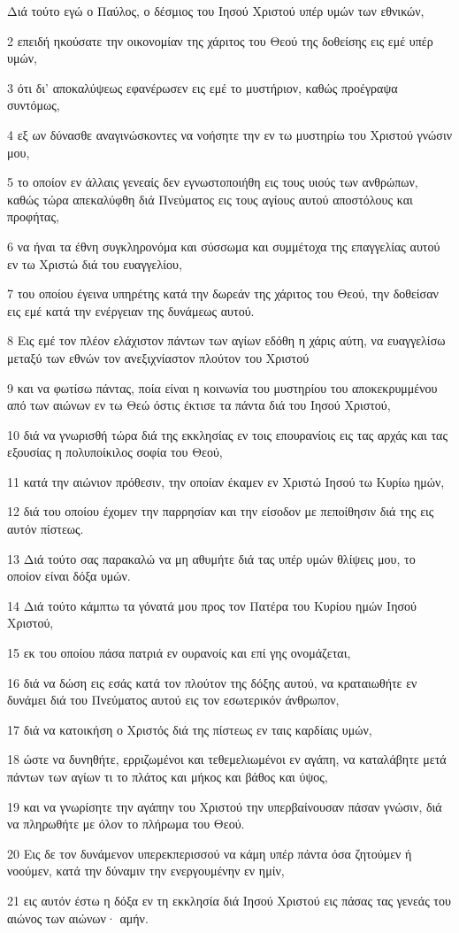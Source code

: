 \par Διά τούτο εγώ ο Παύλος, ο δέσμιος του Ιησού Χριστού υπέρ υμών των εθνικών,
\par 2 επειδή ηκούσατε την οικονομίαν της χάριτος του Θεού της δοθείσης εις εμέ υπέρ υμών,
\par 3 ότι δι' αποκαλύψεως εφανέρωσεν εις εμέ το μυστήριον, καθώς προέγραψα συντόμως,
\par 4 εξ ων δύνασθε αναγινώσκοντες να νοήσητε την εν τω μυστηρίω του Χριστού γνώσιν μου,
\par 5 το οποίον εν άλλαις γενεαίς δεν εγνωστοποιήθη εις τους υιούς των ανθρώπων, καθώς τώρα απεκαλύφθη διά Πνεύματος εις τους αγίους αυτού αποστόλους και προφήτας,
\par 6 να ήναι τα έθνη συγκληρονόμα και σύσσωμα και συμμέτοχα της επαγγελίας αυτού εν τω Χριστώ διά του ευαγγελίου,
\par 7 του οποίου έγεινα υπηρέτης κατά την δωρεάν της χάριτος του Θεού, την δοθείσαν εις εμέ κατά την ενέργειαν της δυνάμεως αυτού.
\par 8 Εις εμέ τον πλέον ελάχιστον πάντων των αγίων εδόθη η χάρις αύτη, να ευαγγελίσω μεταξύ των εθνών τον ανεξιχνίαστον πλούτον του Χριστού
\par 9 και να φωτίσω πάντας, ποία είναι η κοινωνία του μυστηρίου του αποκεκρυμμένου από των αιώνων εν τω Θεώ όστις έκτισε τα πάντα διά του Ιησού Χριστού,
\par 10 διά να γνωρισθή τώρα διά της εκκλησίας εν τοις επουρανίοις εις τας αρχάς και τας εξουσίας η πολυποίκιλος σοφία του Θεού,
\par 11 κατά την αιώνιον πρόθεσιν, την οποίαν έκαμεν εν Χριστώ Ιησού τω Κυρίω ημών,
\par 12 διά του οποίου έχομεν την παρρησίαν και την είσοδον με πεποίθησιν διά της εις αυτόν πίστεως.
\par 13 Διά τούτο σας παρακαλώ να μη αθυμήτε διά τας υπέρ υμών θλίψεις μου, το οποίον είναι δόξα υμών.
\par 14 Διά τούτο κάμπτω τα γόνατά μου προς τον Πατέρα του Κυρίου ημών Ιησού Χριστού,
\par 15 εκ του οποίου πάσα πατριά εν ουρανοίς και επί γης ονομάζεται,
\par 16 διά να δώση εις εσάς κατά τον πλούτον της δόξης αυτού, να κραταιωθήτε εν δυνάμει διά του Πνεύματος αυτού εις τον εσωτερικόν άνθρωπον,
\par 17 διά να κατοικήση ο Χριστός διά της πίστεως εν ταις καρδίαις υμών,
\par 18 ώστε να δυνηθήτε, ερριζωμένοι και τεθεμελιωμένοι εν αγάπη, να καταλάβητε μετά πάντων των αγίων τι το πλάτος και μήκος και βάθος και ύψος,
\par 19 και να γνωρίσητε την αγάπην του Χριστού την υπερβαίνουσαν πάσαν γνώσιν, διά να πληρωθήτε με όλον το πλήρωμα του Θεού.
\par 20 Εις δε τον δυνάμενον υπερεκπερισσού να κάμη υπέρ πάντα όσα ζητούμεν ή νοούμεν, κατά την δύναμιν την ενεργουμένην εν ημίν,
\par 21 εις αυτόν έστω η δόξα εν τη εκκλησία διά Ιησού Χριστού εις πάσας τας γενεάς του αιώνος των αιώνων· αμήν.

